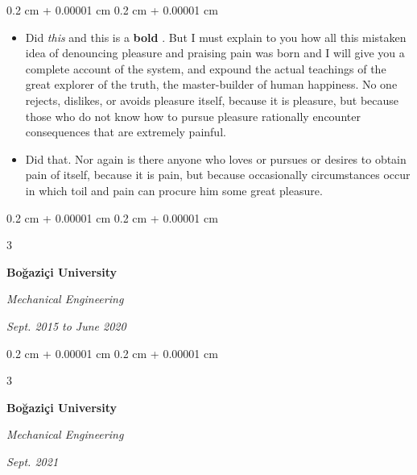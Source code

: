 \documentclass[10pt, letterpaper]{article}
\newenvironment{highlights}{
    \begin{itemize}[
        topsep=0.10 cm,
        parsep=0.10 cm,
        partopsep=0pt,
        itemsep=0pt,
        leftmargin=0.4 cm + 10pt + 0.6 cm
    ]
}{
    \end{itemize}
} %
\newenvironment{onecolentry}{
    \begin{adjustwidth}{
        0.2 cm + 0.00001 cm
    }{
        0.2 cm + 0.00001 cm
    }
}{
    \end{adjustwidth}
} %
\newenvironment{threecolentry}[3][]{
    \onecolentry
    \def\thirdColumn{#3}
    \setcolumnwidth{0.6 cm, \fill, 4.5 cm}
    \begin{paracol}{3}
    #2 \switchcolumn
}{
    \switchcolumn \raggedleft \thirdColumn
    \end{paracol}
    \endonecolentry
} %
\let\hrefWithoutArrow\href
\renewcommand{\href}[2]{\hrefWithoutArrow{#1}{\mbox{\ifthenelse{\equal{#2}{}}{ }{#2 }\raisebox{.15ex}{\footnotesize \faExternalLink*}}}}
\begin{document}
        \vspace{0.10 cm-3px}
        \begin{onecolentry}
            \begin{highlights}
                \item Did \textit{this} and this is a \textbf{bold} \href{https://example.com}{link}. But I must explain to you how all this mistaken idea of denouncing pleasure and praising pain was born and I will give you a complete account of the system, and expound the actual teachings of the great explorer of the truth, the master-builder of human happiness. No one rejects, dislikes, or avoids pleasure itself, because it is pleasure, but because those who do not know how to pursue pleasure rationally encounter consequences that are extremely painful.
                \item Did that. Nor again is there anyone who loves or pursues or desires to obtain pain of itself, because it is pain, but because occasionally circumstances occur in which toil and pain can procure him some great pleasure.
            \end{highlights}
        \end{onecolentry}


        \vspace{0.2 cm-3px}

        \begin{threecolentry}{
            \vspace*{\fill}
            \textbullet
            \vspace*{3px}
            \vspace*{\fill}
        }{
            
            
        \textit{Sept. 2015 to June 2020}}
            \textbf{Boğaziçi University}

            \textit{Mechanical Engineering}
        \end{threecolentry}



        \vspace{0.2 cm-3px}

        \begin{threecolentry}{
            \vspace*{\fill}
            \textbullet
            \vspace*{3px}
            \vspace*{\fill}
        }{
            
            
        \textit{Sept. 2021}}
            \textbf{Boğaziçi University}

            \textit{Mechanical Engineering}
        \end{threecolentry}
\end{document}
